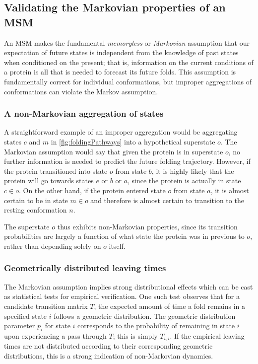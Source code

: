 \documentclass{article}
\begin{document}
\subsection{Validating the Markovian properties of an MSM}
An MSM makes the fundamental \textit{memoryless} or \textit{Markovian} assumption that our expectation of future states is independent from the knowledge of past states when conditioned on the present; that is, information on the current conditions of a protein is all that is needed to forecast its future folds. This assumption is fundamentally correct for individual conformations, but improper aggregations of conformations can violate the Markov assumption.

\subsubsection{A non-Markovian aggregation of states}
A straightforward example of an improper aggregation would be aggregating states $c$ and $m$ in \autoref{fig:foldingPathways} into a hypothetical superstate $o$. The Markovian assumption would say that given the protein is in superstate $o$, no further information is needed to predict the future folding trajectory. However, if the protein transitioned into state $o$ from state $b$, it is highly likely that the protein will go towards states $e$ or $b$ or $a$, since the protein is actually in state $c \in o$. On the other hand, if the protein entered state $o$ from state $a$, it is almost certain to be in state $m \in o$ and therefore is almost certain to transition to the resting conformation $n$.

The superstate $o$ thus exhibits non-Markovian properties, since its transition probabilities are largely a function of what state the protein was in previous to $o$, rather than depending solely on $o$ itself.

\subsubsection{Geometrically distributed leaving times}
The Markovian assumption implies strong distributional effects which can be cast as statistical tests for empirical verification. One such test observes that for a candidate transition matrix $T$, the expected amount of time a fold remains in a specified state $i$ follows a geometric distribution. The geometric distribution parameter $p_i$ for state $i$ corresponds to the probability of remaining in state $i$ upon experiencing a pass through $T$; this is simply $T_{i,i}$. If the empirical leaving times are not distributed according to their corresponding geometric distributions, this is a strong indication of non-Markovian dynamics.
\end{document}
